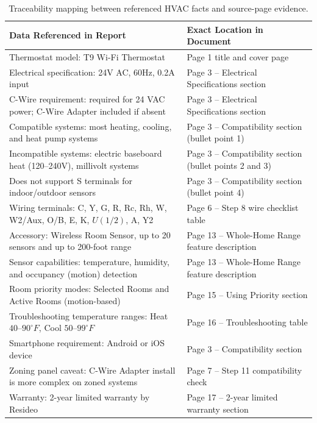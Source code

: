 \documentclass[11pt,a4paper]{article}
\begin{document}
\begin{table}[H]
\centering
\small
\setlength{\tabcolsep}{6pt}
\begin{tabularx}{\textwidth}{L{0.52\textwidth}Y}
\toprule
{}
\textbf{Data Referenced in Report} & \textbf{Exact Location in Document} \\
\midrule
Thermostat model: T9 Wi-Fi Thermostat & Page 1 title and cover page \\
Electrical specification: 24V AC, 60Hz, 0.2A input & Page 3 -- Electrical Specifications section \\
C-Wire requirement: required for 24 VAC power; C-Wire Adapter included if absent & Page 3 -- Electrical Specifications section \\
Compatible systems: most heating, cooling, and heat pump systems & Page 3 -- Compatibility section (bullet point 1) \\
Incompatible systems: electric baseboard heat (120--240V), millivolt systems & Page 3 -- Compatibility section (bullet points 2 and 3) \\
Does not support S terminals for indoor/outdoor sensors & Page 3 -- Compatibility section (bullet point 4) \\
Wiring terminals: C, Y, G, R, Rc, Rh, W, W2/Aux, O/B, E, K, $U(1/2)$, A, Y2 & Page 6 -- Step 8 wire checklist table \\
Accessory: Wireless Room Sensor, up to 20 sensors and up to 200-foot range & Page 13 -- Whole-Home Range feature description \\
Sensor capabilities: temperature, humidity, and occupancy (motion) detection & Page 13 -- Whole-Home Range feature description \\
Room priority modes: Selected Rooms and Active Rooms (motion-based) & Page 15 -- Using Priority section \\
Troubleshooting temperature ranges: Heat $40$--$90^{\circ}F$, Cool $50$--$99^{\circ}F$ & Page 16 -- Troubleshooting table \\
Smartphone requirement: Android or iOS device & Page 3 -- Compatibility section \\
Zoning panel caveat: C-Wire Adapter install is more complex on zoned systems & Page 7 -- Step 11 compatibility check \\
Warranty: 2-year limited warranty by Resideo & Page 17 -- 2-year limited warranty section \\
\bottomrule
\end{tabularx}
\caption{Traceability mapping between referenced HVAC facts and source-page evidence.}
\label{tab:source-traceability}
\end{table}
\end{document}
